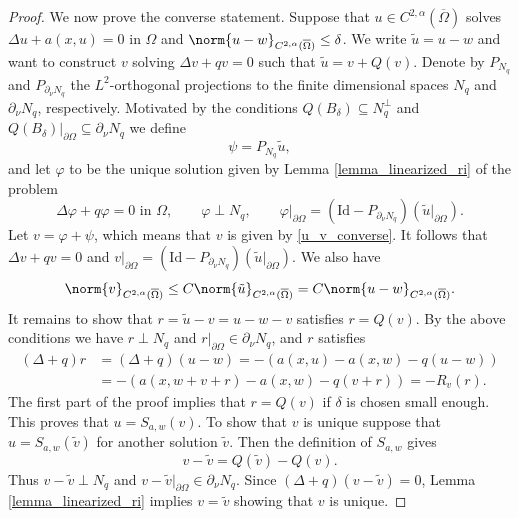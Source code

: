 \documentclass[11pt,a4paper]{amsart}
\theoremstyle{definition}
\numberwithin{equation}{section}
\newcommand{\ol}[1]{\overline{#1}}
\newcommand{\p}{\partial}
\newcommand{\Om}{\Omega}
\begin{document}
\begin{proof}
We now prove the converse statement. Suppose that $u \in C^{2,\alpha}(\ol{\Om})$ solves $\Delta u + a(x,u) = 0$ in $\Om$ and $\norm{u-w}_{C^{2,\alpha}(\ol{\Om})} \leq \delta$. We write $\tilde{u} = u - w$ and want to construct $v$ solving $\Delta v + qv = 0$ such that $\tilde{u} = v + Q(v)$. Denote by $P_{N_q}$ and $P_{\p_{\nu} N_q}$ the $L^2$-orthogonal projections to the finite dimensional spaces $N_q$ and $\p_{\nu} N_q$, respectively. Motivated by the conditions $Q(B_{\delta}) \subseteq N_q^{\perp}$ and $Q(B_{\delta})|_{\p \Om} \subseteq \p_{\nu} N_q$ we define 
\[
\psi = P_{N_q} \tilde{u},
\]
and let $\varphi$ to be the unique solution given by Lemma \ref{lemma_linearized_ri} of the problem 
\[
\Delta \varphi + q \varphi = 0 \text{ in $\Om$}, \qquad \varphi \perp N_q, \qquad \varphi|_{\p \Om} = (\mathrm{Id}-P_{\p_{\nu} N_q})(\tilde{u}|_{\p \Om}).
\]
Let $v = \varphi + \psi$, which means that $v$ is given by \eqref{u_v_converse}. It follows that $\Delta v + qv = 0$ and $v|_{\p \Om} = (\mathrm{Id}-P_{\p_{\nu} N_q})(\tilde{u}|_{\p \Om})$. We also have 
\[
\norm{v}_{C^{2,\alpha}(\ol{\Om})} \leq C \norm{\tilde{u}}_{C^{2,\alpha}(\ol{\Om})} = C \norm{u-w}_{C^{2,\alpha}(\ol{\Om})}.
\]
It remains to show that $r = \tilde{u} - v = u-w-v$ satisfies $r = Q(v)$. By the above conditions we have $r \perp N_q$ and $r|_{\p \Om} \in \p_{\nu} N_q$, and $r$ satisfies 
\begin{align*}
(\Delta + q) r &= (\Delta+q)(u-w) = -(a(x,u)-a(x,w) - q(u-w)) \\
 &= -(a(x,w+v+r)-a(x,w)-q(v+r)) = -R_v(r).
\end{align*}
The first part of the proof implies that $r = Q(v)$ if $\delta$ is chosen small enough. This proves that $u = S_{a,w}(v)$. To show that $v$ is unique suppose that $u = S_{a,w}(\tilde{v})$ for another solution $\tilde{v}$. Then the definition of $S_{a,w}$ gives  
\[
v-\tilde{v} = Q(\tilde{v}) - Q(v).
\]
Thus $v-\tilde{v} \perp N_q$ and $v-\tilde{v}|_{\p \Om} \in \p_{\nu} N_q$. Since $(\Delta+q)(v-\tilde{v}) = 0$, Lemma \ref{lemma_linearized_ri} implies $v = \tilde{v}$ showing that $v$ is unique.
\end{proof}
\end{document}

